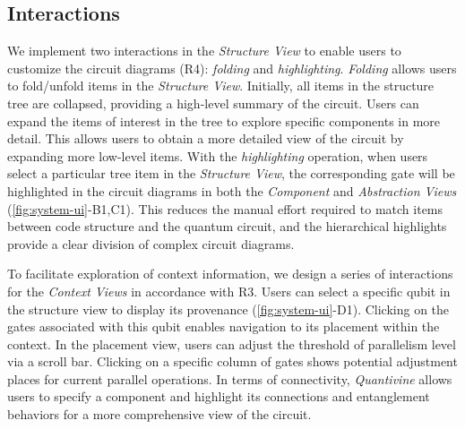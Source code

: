 \subsection{Interactions}
\label{sec:system:interaction}

We implement two interactions in the \emph{Structure View} to enable users to customize the circuit diagrams ({R4}): \emph{folding} and \emph{highlighting}.
\emph{Folding} allows users to fold/unfold items in the \emph{Structure View}.
Initially, all items in the structure tree are collapsed, providing a high-level summary of the circuit. 
Users can expand the items of interest in the tree to explore specific components in more detail. 
This allows users to obtain a more detailed view of the circuit by expanding more low-level items.
With the \emph{highlighting} operation, when users select a particular tree item in the \emph{Structure View}, the corresponding gate will be highlighted in the circuit diagrams in both the \emph{Component} and \emph{Abstraction Views} (\cref{fig:system-ui}-B1,C1). This reduces the manual effort required to match items between code structure and the quantum circuit, and the hierarchical highlights provide a clear division of complex circuit diagrams.



To facilitate exploration of context information, we design a series of interactions for the \emph{Context Views} in accordance with {R3}.
Users can select a specific qubit in the structure view to display its provenance (\cref{fig:system-ui}-D1).
Clicking on the gates associated with this qubit enables navigation to its placement within the context.
In the placement view, users can adjust the threshold of parallelism level via a scroll bar.
Clicking on a specific column of gates shows potential adjustment places for current parallel operations.
In terms of connectivity, \emph{Quantivine} allows users to specify a component and highlight its connections and entanglement behaviors for a more comprehensive view of the circuit.


